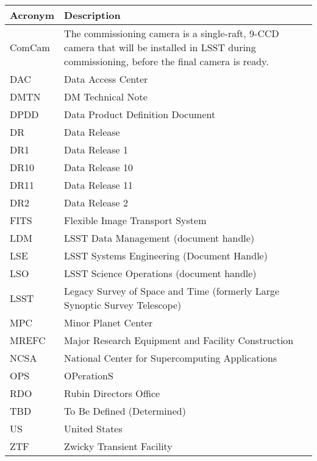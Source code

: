 \addtocounter{table}{-1}
\begin{longtable}{p{}p{}}\hline
\textbf{Acronym} & \textbf{Description}  \\\hline

ComCam & The commissioning camera is a single-raft, 9-CCD camera that will be installed in LSST during commissioning, before the final camera is ready. \\\hline
DAC & Data Access Center \\\hline
DMTN & DM Technical Note \\\hline
DPDD & Data Product Definition Document \\\hline
DR & Data Release \\\hline
DR1 & Data Release 1 \\\hline
DR10 & Data Release 10 \\\hline
DR11 & Data Release 11 \\\hline
DR2 & Data Release 2 \\\hline
FITS & Flexible Image Transport System \\\hline
LDM & LSST Data Management (document handle) \\\hline
LSE & LSST Systems Engineering (Document Handle) \\\hline
LSO & LSST Science Operations (document handle) \\\hline
LSST & Legacy Survey of Space and Time (formerly Large Synoptic Survey Telescope) \\\hline
MPC & Minor Planet Center \\\hline
MREFC & Major Research Equipment and Facility Construction \\\hline
NCSA & National Center for Supercomputing Applications \\\hline
OPS & OPerationS \\\hline
RDO & Rubin Directors Office \\\hline
TBD & To Be Defined (Determined) \\\hline
US & United States \\\hline
ZTF & Zwicky Transient Facility \\\hline
\end{longtable}
